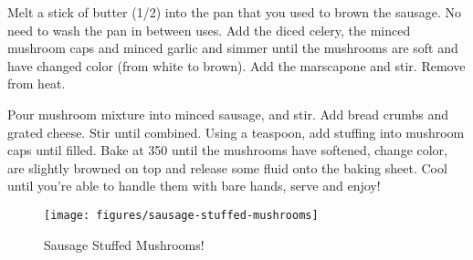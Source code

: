 Melt a stick of butter (\SI{1/2}{\cup}) into the pan that you used to brown the
sausage. No need to wash the pan in between uses. Add the diced celery, the
minced mushroom caps and minced garlic and simmer until the mushrooms are soft
and have changed color (from white to brown). Add the marscapone and stir.
Remove from heat.

Pour mushroom mixture into minced sausage, and stir. Add bread crumbs and grated
cheese. Stir until combined. Using a teaspoon, add stuffing into mushroom caps
until filled. Bake at \SI{350}{\degreeF} until the mushrooms have softened,
change color, are slightly browned on top and release some fluid onto the baking
sheet. Cool until you're able to handle them with bare hands, serve and enjoy!
\begin{figure}
    \centering
    \texttt{[image: figures/sausage-stuffed-mushrooms]}
    \caption*{Sausage Stuffed Mushrooms!}
\end{figure}